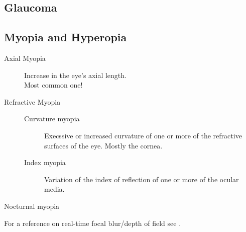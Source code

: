 \documentclass{acm_proc_article-sp}
\newcommand{\todo}[1]{\textcolor{Red}{#1}}
\begin{document}
\subsection{Glaucoma}
\subsection{Myopia and Hyperopia}
\begin{description}
\item[Axial Myopia]
    Increase in the eye's axial length.\\
    Most common one!
\item[Refractive Myopia]
    \begin{description}
    \item[Curvature myopia]
    Execssive or increased curvature of one or more of the refractive surfaces of the eye. Mostly the cornea.
    \item[Index myopia]
    Variation of the index of reflection of one or more of the ocular media.
    \end{description}
\item[Nocturnal myopia]
\end{description}

For a reference on real-time focal blur/depth of field see \cite{gpugems-DoF, gpugems3-DoF}.

\todo{}
\printbibliography

\balancecolumns
\end{document}
